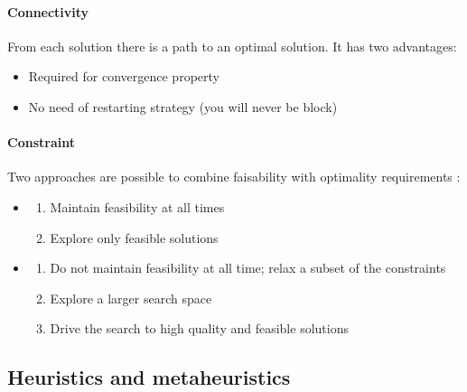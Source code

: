 \paragraph{Connectivity}

From each solution  there is a path  to an optimal solution.  It has two
advantages:
\begin{itemize}
    \item Required for convergence property
    \item No need of restarting strategy (you will never be block)
\end{itemize}

\paragraph{Constraint}

Two approaches are possible to combine faisability with optimality requirements :
\begin{itemize}
\item
	\begin{enumerate}
	\item Maintain feasibility at all times
	\item Explore only feasible solutions
	\end{enumerate}
\item 
	\begin{enumerate}
	\item Do not maintain feasibility at all time; relax a subset of the constraints
	\item Explore a larger search space
	\item Drive the search to high quality and feasible solutions
	\end{enumerate}
\end{itemize}

\subsection{Heuristics and metaheuristics}

